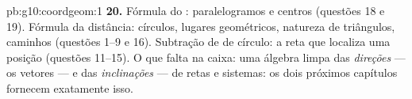 \begin{solution}{pb:g10:coordgeom:1}
\textbf{20.} Fórmula do : paralelogramos e centros
(questões 18 e 19). Fórmula da distância: círculos, lugares
geométricos, natureza de triângulos, caminhos  (questões
1--9 e 16). Subtração de  de círculo: a reta que
localiza uma posição (questões 11--15). O que falta na caixa:
uma álgebra limpa das \emph{direções} --- os vetores --- e das
\emph{inclinações} ---  de retas e sistemas: os dois
próximos capítulos fornecem exatamente isso.
\end{solution}
